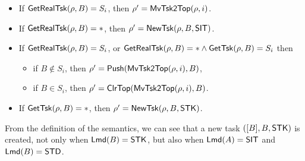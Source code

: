 \noindent {}
\begin{itemize}
	\item If $\mathsf{GetRealTsk}(\rho, B) = S_i$, then $\rho' = \mathsf{MvTsk2Top}(\rho, i)$.
	\item If $\mathsf{GetRealTsk}(\rho, B) = *$, then $\rho' = \mathsf{NewTsk}(\rho, B,{\sf SIT})$.
\end{itemize}

\noindent  {}
\begin{itemize}
	\item If $\mathsf{GetRealTsk}(\rho, B) = S_i$, or $\mathsf{GetRealTsk}(\rho,B) = *\wedge\mathsf{GetTsk}(\rho,B) = S_i$ then
	\begin{itemize}
        \item if $B \not \in S_i$, then $\rho' = \mathsf{Push}(\mathsf{MvTsk2Top}(\rho, i), B)$,
        \item if $B \in S_i$, 	then $\rho' =  \mathsf{ClrTop}(\mathsf{MvTsk2Top}(\rho, i), B)$.
	\end{itemize}
\item If $\mathsf{GetTsk}(\rho, B) = *$, then $\rho' = \mathsf{NewTsk}(\rho, B,{\sf STK})$.
\end{itemize}
From the definition of the semantics, we can see that a new task $([B], B, {\sf STK})$ is created, not only when ${\sf Lmd}(B) = {\sf STK}$, but also when ${\sf Lmd}(A) = {\sf SIT}$ and ${\sf Lmd}(B) = {\sf STD}$.


